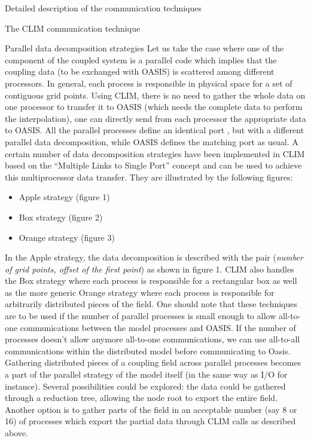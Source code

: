 \begin{section}{Detailed description of the communication techniques}
\begin{subsection}{The CLIM communication technique}
\begin{subsubsection}{Parallel data decomposition strategies}
Let us take the case where one of the component of the coupled system
is a parallel code which implies that the coupling data (to be
exchanged with OASIS) is scattered among different processors. In
general, each process is responsible in physical space for a set of
contiguous grid points. Using
CLIM, there is no need to gather the whole data on one processor to transfer
it to OASIS (which needs the complete data to perform the
interpolation), one can directly send from each processor the appropriate
data to OASIS. All the parallel processes define an identical port ,
but with a different parallel data decomposition, while OASIS defines
the matching port as usual.
A certain number of data decomposition strategies have been
implemented in CLIM based on the ``Multiple Links to Single Port''
concept and can be used to achieve this multiprocessor data transfer.
They are illustrated by the following figures:
\begin{itemize}
\item  Apple strategy (figure 1) \\
\item  Box strategy (figure 2) \\
\item  Orange strategy (figure 3) \\
\end{itemize}

In the Apple strategy, the data decomposition is described with the
pair ({\it number of grid points, offset of the first point}) as shown
in figure 1. CLIM also handles the Box strategy where each process is
responsible for a rectangular box as well as the more generic Orange
strategy where each process is responsible for arbitrarily distributed
pieces of the field. One should note that these techniques are to be
used if the number of parallel processes is small enough to allow
all-to-one communications between the model processes and OASIS. If
the number of processes doesn't allow anymore all-to-one
communications, we can use all-to-all communications within the distributed
model before communicating to Oasis. Gathering
distributed pieces of a coupling field across parallel processes becomes a part
of the parallel strategy of the model itself (in the same way as I/O
for instance). Several possibilities could be explored: the data could
be gathered through a reduction tree, allowing the node root to export
the entire field. Another option is to gather parts of the field in an
acceptable number (say 8 or 16) of processes which export the partial
data through CLIM calls as described above.


\end{subsubsection}
\end{subsection}
\end{section}
